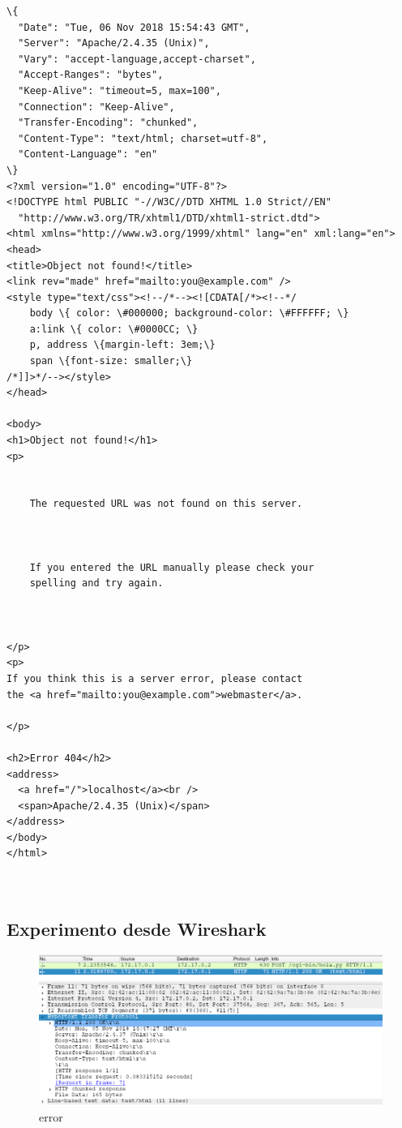 \documentclass[12pt]{extarticle}
\makeatletter
\def\maxwidth{\ifdim\Gin@nat@width>\linewidth\linewidth
    \else\Gin@nat@width\fi}
\let\Oldincludegraphics\includegraphics
\renewcommand{\includegraphics}[1]{\Oldincludegraphics[width=.8\maxwidth]{#1}}
\makeatother
\begin{document}
    \begin{Verbatim}[commandchars=\\\{\}]
\{
  "Date": "Tue, 06 Nov 2018 15:54:43 GMT",
  "Server": "Apache/2.4.35 (Unix)",
  "Vary": "accept-language,accept-charset",
  "Accept-Ranges": "bytes",
  "Keep-Alive": "timeout=5, max=100",
  "Connection": "Keep-Alive",
  "Transfer-Encoding": "chunked",
  "Content-Type": "text/html; charset=utf-8",
  "Content-Language": "en"
\}
<?xml version="1.0" encoding="UTF-8"?>
<!DOCTYPE html PUBLIC "-//W3C//DTD XHTML 1.0 Strict//EN"
  "http://www.w3.org/TR/xhtml1/DTD/xhtml1-strict.dtd">
<html xmlns="http://www.w3.org/1999/xhtml" lang="en" xml:lang="en">
<head>
<title>Object not found!</title>
<link rev="made" href="mailto:you@example.com" />
<style type="text/css"><!--/*--><![CDATA[/*><!--*/ 
    body \{ color: \#000000; background-color: \#FFFFFF; \}
    a:link \{ color: \#0000CC; \}
    p, address \{margin-left: 3em;\}
    span \{font-size: smaller;\}
/*]]>*/--></style>
</head>

<body>
<h1>Object not found!</h1>
<p>


    The requested URL was not found on this server.

  

    If you entered the URL manually please check your
    spelling and try again.

  

</p>
<p>
If you think this is a server error, please contact
the <a href="mailto:you@example.com">webmaster</a>.

</p>

<h2>Error 404</h2>
<address>
  <a href="/">localhost</a><br />
  <span>Apache/2.4.35 (Unix)</span>
</address>
</body>
</html>



    \end{Verbatim}

    \subsection{Experimento desde
Wireshark}\label{experimento-desde-wireshark}

\begin{figure}
\centering
\includegraphics{images/pto1.png}
\caption{error}
\end{figure}
\end{document}
